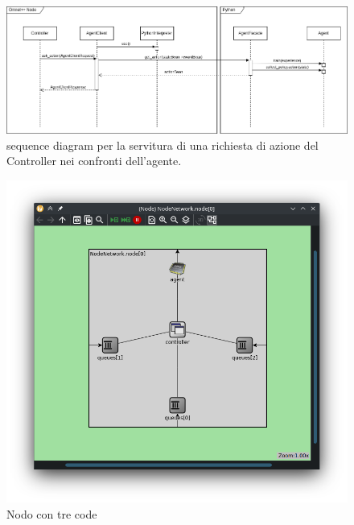 \documentclass[conference]{IEEEtran}
\begin{document}
\begin{figure}
    \centering
    \includegraphics[width=\textwidth]{figs/agentc_sequence_diagram.drawio.png}
    \caption{sequence diagram per la servitura di una richiesta di azione del Controller nei confronti dell'agente.}
    \label{fig:agentc_sequence_diagram}

\end{figure}
\begin{figure}
    \centering
    \includegraphics[width=\textwidth]{figs/node_layout_3queues.png}
    \caption{Nodo con tre code}
    \label{fig:node_layout_3queues}
\end{figure}
\end{document}
